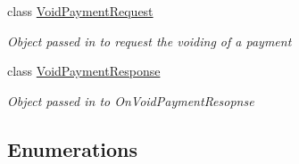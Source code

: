 \begin{DoxyCompactItemize}
class \hyperlink{classcom_1_1clover_1_1remotepay_1_1sdk_1_1_void_payment_request}{Void\+Payment\+Request}
\begin{DoxyCompactList}\small\item\em Object passed in to request the voiding of a payment \end{DoxyCompactList}\item 
class \hyperlink{classcom_1_1clover_1_1remotepay_1_1sdk_1_1_void_payment_response}{Void\+Payment\+Response}
\begin{DoxyCompactList}\small\item\em Object passed in to On\+Void\+Payment\+Resopnse \end{DoxyCompactList}\end{DoxyCompactItemize}
\subsection*{Enumerations}
